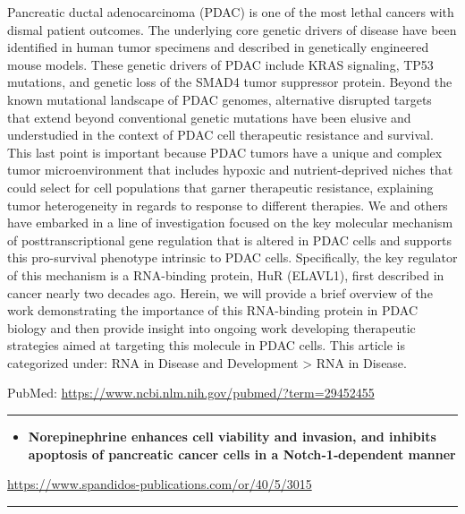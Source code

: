 \documentclass[]{article}
\providecommand{\tightlist}{%
  \setlength{\itemsep}{0pt}\setlength{\parskip}{0pt}}
\begin{document}
Pancreatic ductal adenocarcinoma (PDAC) is one of the most lethal
cancers with dismal patient outcomes. The underlying core genetic
drivers of disease have been identified in human tumor specimens and
described in genetically engineered mouse models. These genetic drivers
of PDAC include KRAS signaling, TP53 mutations, and genetic loss of the
SMAD4 tumor suppressor protein. Beyond the known mutational landscape of
PDAC genomes, alternative disrupted targets that extend beyond
conventional genetic mutations have been elusive and understudied in the
context of PDAC cell therapeutic resistance and survival. This last
point is important because PDAC tumors have a unique and complex tumor
microenvironment that includes hypoxic and nutrient-deprived niches that
could select for cell populations that garner therapeutic resistance,
explaining tumor heterogeneity in regards to response to different
therapies. We and others have embarked in a line of investigation
focused on the key molecular mechanism of posttranscriptional gene
regulation that is altered in PDAC cells and supports this pro-survival
phenotype intrinsic to PDAC cells. Specifically, the key regulator of
this mechanism is a RNA-binding protein, HuR (ELAVL1), first described
in cancer nearly two decades ago. Herein, we will provide a brief
overview of the work demonstrating the importance of this RNA-binding
protein in PDAC biology and then provide insight into ongoing work
developing therapeutic strategies aimed at targeting this molecule in
PDAC cells. This article is categorized under: RNA in Disease and
Development \textgreater{} RNA in Disease.

PubMed: \url{https://www.ncbi.nlm.nih.gov/pubmed/?term=29452455}

{}

{}

\begin{center}\rule{0.5\linewidth}{\linethickness}\end{center}

\begin{itemize}
\tightlist
\item
  \textbf{Norepinephrine enhances cell viability and invasion, and
  inhibits apoptosis of pancreatic cancer cells in a Notch‑1‑dependent
  manner}
\end{itemize}

\url{https://www.spandidos-publications.com/or/40/5/3015}

\begin{center}\rule{0.5\linewidth}{\linethickness}\end{center}
\end{document}
